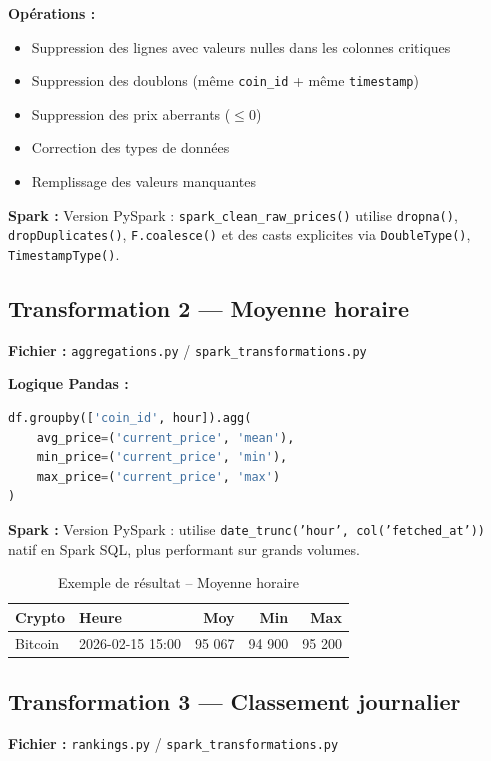 \documentclass[12pt,a4paper]{article}
\newcommand{\sparkbox}[1]{%
  \vspace{4pt}
  \noindent\colorbox{orange!15}{\parbox{\dimexpr\linewidth-2\fboxsep}{%
    {\color{sparkcolor}\textbf{Spark :}} #1
  }}
  \vspace{4pt}
}
\begin{document}
\textbf{Opérations :}
\begin{itemize}[noitemsep]
    \item Suppression des lignes avec valeurs nulles dans les colonnes critiques
    \item Suppression des doublons (même \texttt{coin\_id} + même \texttt{timestamp})
    \item Suppression des prix aberrants ($\leq 0$)
    \item Correction des types de données
    \item Remplissage des valeurs manquantes
\end{itemize}

\sparkbox{Version PySpark : \texttt{spark\_clean\_raw\_prices()} utilise \texttt{dropna()}, \texttt{dropDuplicates()}, \texttt{F.coalesce()} et des casts explicites via \texttt{DoubleType()}, \texttt{TimestampType()}.}

\subsection{Transformation 2 --- Moyenne horaire}
\textbf{Fichier :} \texttt{aggregations.py} / \texttt{spark\_transformations.py}

\textbf{Logique Pandas :}
\begin{lstlisting}[language=Python]
df.groupby(['coin_id', hour]).agg(
    avg_price=('current_price', 'mean'),
    min_price=('current_price', 'min'),
    max_price=('current_price', 'max')
)
\end{lstlisting}

\sparkbox{Version PySpark : utilise \texttt{date\_trunc('hour', col('fetched\_at'))} natif en Spark SQL, plus performant sur grands volumes.}

\begin{table}[H]
\centering
\begin{tabular}{|l|l|r|r|r|}
\hline
\textbf{Crypto} & \textbf{Heure} & \textbf{Moy} & \textbf{Min} & \textbf{Max} \\
\hline
Bitcoin & 2026-02-15 15:00 & 95 067 & 94 900 & 95 200 \\
\hline
\end{tabular}
\caption{Exemple de résultat -- Moyenne horaire}
\end{table}

\subsection{Transformation 3 --- Classement journalier}
\textbf{Fichier :} \texttt{rankings.py} / \texttt{spark\_transformations.py}
\end{document}
